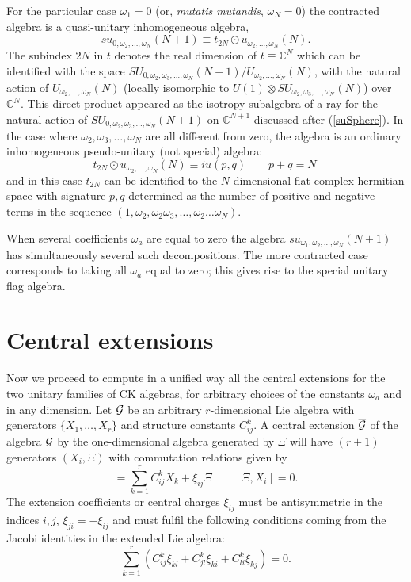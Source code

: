 \documentclass[12pt]{article}
\begin{document}
For the particular case ${\omega}_1=0$ (or, \emph{mutatis mutandis}, ${\omega}_N=0$) the
contracted algebra is a quasi-unitary inhomogeneous algebra,
$$
su_{0,{\omega}_2,\dots,{\omega}_N}(N+1)
\equiv t_{2N}\odot  u_{{\omega}_2,\dots,{\omega}_N}(N).
$$
The subindex $2N$ in $t$ denotes the real dimension of
$t \equiv {{\mathbb C}}^N$ which can be identified with the space
$SU_{0, {\omega}_2, {\omega}_3, \dots, {\omega}_N}(N+1) / U_{{\omega}_2,\dots,{\omega}_N}(N)$, with the
natural action of  $U_{{\omega}_2,\dots,{\omega}_N}(N)$ (locally isomorphic to $
U(1) \otimes SU_{{\omega}_2, {\omega}_3, \dots, {\omega}_N}(N)$) over ${{\mathbb C}}^N$. This
direct product appeared as the isotropy subalgebra of a ray for the natural
action of $SU_{0, {\omega}_2, {\omega}_3, \dots, {\omega}_N}(N+1)$ on ${{\mathbb C}}^{N+1}$ discussed after
(\ref{suSphere}). In the case where
${\omega}_2, {\omega}_3, \dots, {\omega}_N$ are all different from zero, the algebra is an
ordinary inhomogeneous pseudo-unitary (not special) algebra:
$$
t_{2N}\odot  u_{{\omega}_2,\dots,{\omega}_N}(N) \equiv iu({p,q})
\qquad p+q=N \
$$
and in this case
$t_{2N}$ can be identified to the
$N$-dimensional flat complex hermitian space with signature
$p,q$ determined as the number of positive and negative terms in the sequence
$(1, {\omega}_2, {\omega}_2{\omega}_3, \dots, {\omega}_2\dots{\omega}_N)$.

When several coefficients ${\omega}_a$ are equal to zero the algebra
$su_{{\omega}_1,{\omega}_2,\dots,{\omega}_N}(N+1)$ has simultaneously several such
decompositions. The more contracted case corresponds
to taking all ${\omega}_a$ equal to zero; this gives rise to the  special
unitary flag algebra.

\section{Central extensions}
\label{sec.3}

Now we proceed to compute in a unified way all the central extensions
for the two unitary families of CK algebras, for arbitrary choices of
the constants ${\omega}_a$ and  in any dimension. Let ${{\cal G}}$  be an arbitrary
$r$-dimensional Lie algebra with generators $\{X_1,\dots,X_r\}$ and
structure constants
$C_{ij}^k$. A central extension   $\overline{{\cal G}}$ of the algebra ${{\cal G}}$
by the one-dimensional algebra generated by
 $\Xi$ will have $(r+1)$ generators
$( X_i,\Xi) $ with commutation relations given by
\begin{equation}
[X_i,X_j]=\sum_{k=1}^r C_{ij}^k X_k  + {\xi}_{ij} \Xi  \qquad
[\Xi,X_i]=0 .
\label{CentExt}
\end{equation}
The   extension coefficients or  central charges
${\xi}_{ij}$  must be antisymmetric in the indices $i,j$,
${\xi}_{ji}=-{\xi}_{ij}$ and must fulfil the following conditions
coming from the Jacobi identities in the extended Lie algebra:
\begin{equation}
\sum_{k=1}^r
\left(
C_{ij}^{k}{\xi}_{kl}+C_{jl}^{k}{\xi}_{ki}+C_{li}^{k}{\xi}_{kj}
\right) =0 .
\label{JacobiEqs}
\end{equation}
\end{document}
